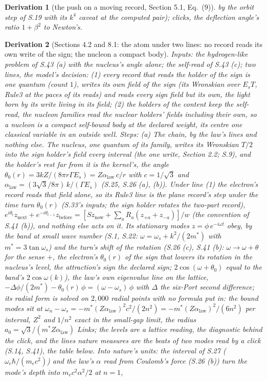 \documentclass[pdflatex,sn-mathphys-num]{sn-jnl}
\theoremstyle{thmstyleone}
\newtheorem{derivation}{Derivation}
\begin{document}
\begin{derivation}[the push on a moving record, Section 5.1, Eq.~(9)]
by the orbit step of S.19 with its $k^4$ caveat at the computed pair); clicks, the deflection angle's ratio $1 + \beta^2$ to Newton's.
\end{derivation}


\begin{derivation}[Sections 4.2 and 8.1: the atom under two lines: no record reads its own write of the sign; the nucleon a compact body]
\emph{Inputs:} the hydrogen-like problem of S.43 (a) with the nucleus's angle alone; the self-read of S.43 (c); two lines, the model's decision: (1) every record that reads the holder of the sign is one quantum (count $1$), writes its own field of the sign (its Wronskian over $E_s T$, Rule3 at the paces of its reads) and reads every sign field but its own, the light born by its write living in its field; (2) the holders of the content keep the self-read, the nucleon families read the nuclear holders' fields including their own, so a nucleon is a compact self-bound body at the declared weight, its centre one classical variable in an outside well. \emph{Steps:} (a) \emph{The chain, by the law's lines and nothing else.} The nucleus, one quantum of its family, writes its Wronskian $T / 2$ into the sign holder's field every interval (the one write, Section 2.2; S.9), and the holder's rest far from it is the kernel's, the angle $\theta_0(r) = 3kZ / (8\pi r\Gamma E_s) = Z\alpha_{\mathrm{law}}\,c / r$ with $c = 1 / \sqrt 3$ and $\alpha_{\mathrm{law}} = (3\sqrt 3 / 8\pi)\,k / (\Gamma E_s)$ (S.25, S.26 (a), (b)). Under line (1) the electron's record reads that field alone, so its Rule3 line is the plane record's step under the time turn $\theta_0(r)$ (S.33's inputs; the sign holder rotates the two-part record), $e^{i\theta_t} z_{\mathrm{next}} + e^{-i\theta_{t-1}} z_{\mathrm{before}} = [S z_{\mathrm{now}} + \sum_a R_a(z_{+a} + z_{-a})] / w$ (the convention of S.41 (b)), and nothing else acts on it. Its stationary modes $z = \phi\,e^{-i\omega t}$ obey, by the band at small wave number (S.1, S.22: $\omega = \omega_s + k^2 / (2m^*)$ with $m^* = 3\tan\omega_s$) and the turn's shift of the rotation (S.26 (c), S.41 (b): $\omega \to \omega + \theta$ for the sense $+$, the electron's $\theta_0(r)$ of the sign that lowers its rotation in the nucleus's level, the attraction's sign the declared sign; $2\cos(\omega + \theta_0)$ equal to the band's $2\cos\omega(k)$), the law's own eigenvalue line on the lattice, $-\Delta\phi / (2m^*) - \theta_0(r)\,\phi = (\omega - \omega_s)\,\phi$ with $\Delta$ the six-Port second difference; its radial form is solved on $2{,}000$ radial points with no formula put in: the bound modes sit at $\omega_n - \omega_s = -m^*(Z\alpha_{\mathrm{law}})^2 c^2 / (2n^2) = -m^*(Z\alpha_{\mathrm{law}})^2 / (6n^2)$ per interval, $Z^2$ and $1 / n^2$ exact in the small-gap limit, the radius $a_0 = \sqrt 3 / (m^* Z\alpha_{\mathrm{law}})$ Links; the levels are a lattice reading, the diagnostic behind the click, and the lines nature measures are the beats of two modes read by a click (S.14, S.41), the table below. Into nature's units: the interval of S.27 ($\omega_e\hbar / (m_e c^2)$) and the law's $\alpha$ read from Coulomb's force (S.26 (b)) turn the mode's depth into $m_e c^2\alpha^2 / 2$ at $n = 1$, 
\end{derivation}
\end{document}
